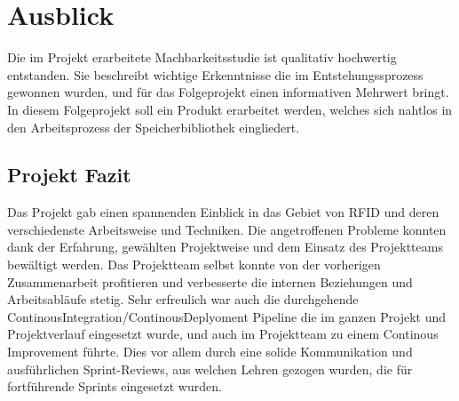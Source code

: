 \chapter{Ausblick}
\label{ch:Ausblick}

Die im Projekt erarbeitete Machbarkeitsstudie ist qualitativ hochwertig entstanden. Sie beschreibt wichtige Erkenntnisse die im Entstehungssprozess gewonnen wurden, und für das Folgeprojekt einen informativen Mehrwert bringt. In diesem Folgeprojekt soll ein Produkt erarbeitet werden, welches sich nahtlos in den Arbeitsprozess der Speicherbibliothek eingliedert.

\section{Projekt Fazit}
Das Projekt gab einen spannenden Einblick in das Gebiet von RFID und deren verschiedenste Arbeitsweise und Techniken. Die angetroffenen Probleme konnten dank der Erfahrung, gewählten Projektweise und dem Einsatz des Projektteams bewältigt werden. Das Projektteam selbst konnte von der vorherigen Zusammenarbeit profitieren und verbesserte die internen Beziehungen und Arbeitsabläufe stetig. Sehr erfreulich war auch die durchgehende ContinousIntegration/ContinousDeplyoment Pipeline die im ganzen Projekt und Projektverlauf eingesetzt wurde, und auch im Projektteam zu einem Continous Improvement führte. Dies vor allem durch eine solide Kommunikation und ausführlichen Sprint-Reviews, aus welchen Lehren gezogen wurden, die für fortführende Sprints eingesetzt wurden.
